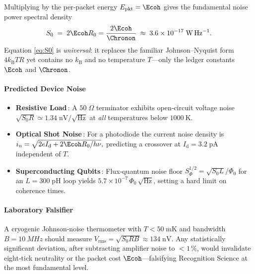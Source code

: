 \documentclass[11pt,oneside]{book}
\begin{document}
{Multiplying by the per‑packet energy
\(
   E_{\text{pkt}}=\Ecoh
\)
gives the fundamental noise power spectral density
\[
   S_{0}
   \;=\;
   2\Ecoh R_{0}
   =
   \frac{2\Ecoh}{\Chronon}
   \;\approx\;
   3.6\times10^{-17}\;
   \mathrm{W\,Hz^{-1}}.
   \label{eq:S0}
\]
Equation \eqref{eq:S0} is \emph{universal}: it replaces the familiar
Johnson–Nyquist form $4k_{\mathrm B}T R$ yet contains no $k_{\mathrm
B}$ and no temperature $T$—only the ledger constants $\Ecoh$ and
$\Chronon$.

\paragraph{Predicted Device Noise}

\begin{itemize}\setlength\itemsep{4pt}
\item \textbf{Resistive Load}\,:  
      A $50\;\Omega$ terminator exhibits open‑circuit voltage noise
      \(
         \sqrt{S_{0}R}\simeq1.34\;\mathrm{nV/\sqrt{Hz}}
      \)
      at \emph{all} temperatures below $\SI{1000}{\kelvin}$.
\item \textbf{Optical Shot Noise}\,:  
      For a photodiode the current noise density is
      \(
         i_{n}=\sqrt{2eI_{\mathrm d}+2\Ecoh R_{0}/h\nu},
      \)
      predicting a crossover at  
      $I_{\mathrm d}=3.2\;\mathrm{pA}$ independent of $T$.
\item \textbf{Superconducting Qubits}\,:  
      Flux‑quantum noise floor
      \(
         S_{\Phi}^{1/2}= \sqrt{S_{0}L}/\Phi_{0}
      \)
      for an $L=300\;\mathrm{pH}$ loop yields
      $5.7\times10^{-7}\,\Phi_{0}\,\mathrm{\sqrt{Hz}}$,  
      setting a hard limit on coherence times.\!
\end{itemize}

\paragraph{Laboratory Falsifier}

A cryogenic Johnson‑noise thermometer with
\(
   T<50\;\mathrm{mK}
\)
and bandwidth
\(
   B=\SI{10}{MHz}
\)
should measure
\(
   V_{\mathrm{rms}} = \sqrt{S_{0}RB}\approx134\;\mathrm{nV}.
\)
Any statistically significant deviation,
after subtracting amplifier noise to $<1\,\%$,
would invalidate eight‑tick neutrality or the packet cost
$\Ecoh$—falsifying Recognition Science at the most fundamental level.

}
\end{document}
